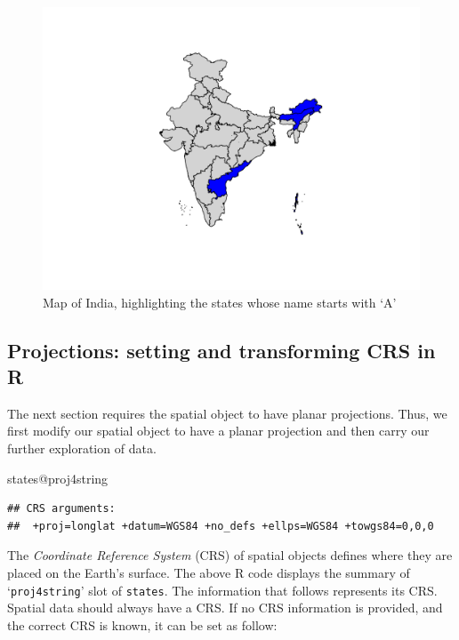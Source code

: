 \documentclass[]{article}
\newenvironment{Shaded}{}{}
\newcommand{\NormalTok}[1]{#1}
\newcommand{\OperatorTok}[1]{\textcolor[rgb]{0.40,0.40,0.40}{#1}}
\begin{document}
\begin{figure}
\centering
\includegraphics{TutorialNotebook_files/figure-latex/unnamed-chunk-9-1.pdf}
\caption{Map of India, highlighting the states whose name starts with
`A'}
\end{figure}

\hypertarget{projections-setting-and-transforming-crs-in-r}{%
\subsection{Projections: setting and transforming CRS in
R}\label{projections-setting-and-transforming-crs-in-r}}

The next section requires the spatial object to have planar projections.
Thus, we first modify our spatial object to have a planar projection and
then carry our further exploration of data.

\begin{Shaded}
\begin{Highlighting}[]
\NormalTok{states}\OperatorTok{@}\NormalTok{proj4string}
\end{Highlighting}
\end{Shaded}

\begin{verbatim}
## CRS arguments:
##  +proj=longlat +datum=WGS84 +no_defs +ellps=WGS84 +towgs84=0,0,0
\end{verbatim}

The \emph{Coordinate Reference System} (CRS) of spatial objects defines
where they are placed on the Earth's surface. The above R code displays
the summary of `\texttt{proj4string}' slot of \texttt{states}. The
information that follows represents its CRS. Spatial data should always
have a CRS. If no CRS information is provided, and the correct CRS is
known, it can be set as follow:
\end{document}
